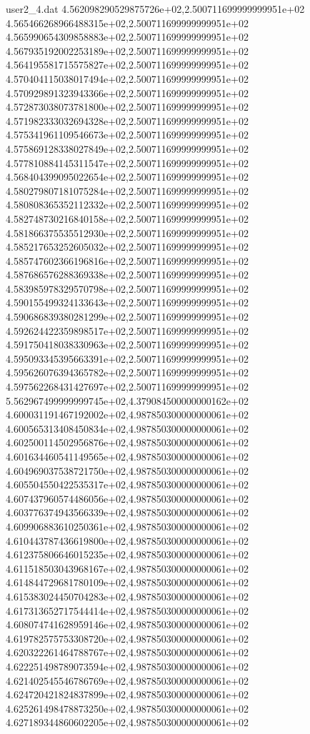 \begin{filecontents}{user2_4.dat}
4.562098290529875726e+02,2.500711699999999951e+02
4.565466268966488315e+02,2.500711699999999951e+02
4.565990654309858883e+02,2.500711699999999951e+02
4.567935192002253189e+02,2.500711699999999951e+02
4.564195581715575827e+02,2.500711699999999951e+02
4.570404115038017494e+02,2.500711699999999951e+02
4.570929891323943366e+02,2.500711699999999951e+02
4.572873038073781800e+02,2.500711699999999951e+02
4.571982333032694328e+02,2.500711699999999951e+02
4.575341961109546673e+02,2.500711699999999951e+02
4.575869128338027849e+02,2.500711699999999951e+02
4.577810884145311547e+02,2.500711699999999951e+02
4.568404399095022654e+02,2.500711699999999951e+02
4.580279807181075284e+02,2.500711699999999951e+02
4.580808365352112332e+02,2.500711699999999951e+02
4.582748730216840158e+02,2.500711699999999951e+02
4.581866375535512930e+02,2.500711699999999951e+02
4.585217653252605032e+02,2.500711699999999951e+02
4.585747602366196816e+02,2.500711699999999951e+02
4.587686576288369338e+02,2.500711699999999951e+02
4.583985978329570798e+02,2.500711699999999951e+02
4.590155499324133643e+02,2.500711699999999951e+02
4.590686839380281299e+02,2.500711699999999951e+02
4.592624422359898517e+02,2.500711699999999951e+02
4.591750418038330963e+02,2.500711699999999951e+02
4.595093345395663391e+02,2.500711699999999951e+02
4.595626076394365782e+02,2.500711699999999951e+02
4.597562268431427697e+02,2.500711699999999951e+02
5.562967499999999745e+02,4.379084500000000162e+02
4.600031191467192002e+02,4.987850300000000061e+02
4.600565313408450834e+02,4.987850300000000061e+02
4.602500114502956876e+02,4.987850300000000061e+02
4.601634460541149565e+02,4.987850300000000061e+02
4.604969037538721750e+02,4.987850300000000061e+02
4.605504550422535317e+02,4.987850300000000061e+02
4.607437960574486056e+02,4.987850300000000061e+02
4.603776374943566339e+02,4.987850300000000061e+02
4.609906883610250361e+02,4.987850300000000061e+02
4.610443787436619800e+02,4.987850300000000061e+02
4.612375806646015235e+02,4.987850300000000061e+02
4.611518503043968167e+02,4.987850300000000061e+02
4.614844729681780109e+02,4.987850300000000061e+02
4.615383024450704283e+02,4.987850300000000061e+02
4.617313652717544414e+02,4.987850300000000061e+02
4.608074741628959146e+02,4.987850300000000061e+02
4.619782575753308720e+02,4.987850300000000061e+02
4.620322261464788767e+02,4.987850300000000061e+02
4.622251498789073594e+02,4.987850300000000061e+02
4.621402545546786769e+02,4.987850300000000061e+02
4.624720421824837899e+02,4.987850300000000061e+02
4.625261498478873250e+02,4.987850300000000061e+02
4.627189344860602205e+02,4.987850300000000061e+02

\end{filecontents}
